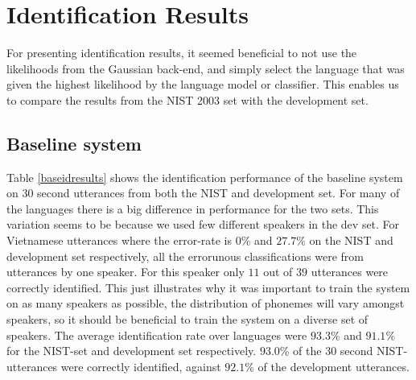 \chapter{Identification Results}

For presenting identification results, it seemed beneficial to not use the likelihoods from the Gaussian back-end, and simply select the language that was given the highest likelihood by the language model or classifier. This enables us to compare the results from the NIST 2003 set with the development set.

\section{Baseline system}

Table \ref{baseidresults} shows the identification performance of the baseline system on 30 second utterances from both the NIST and development set. For many of the languages there is a big difference in performance for the two sets. This variation seems to be because we used few different speakers in the dev set. For Vietnamese utterances where the error-rate is $0$\% and $27.7$\% on the NIST and development set respectively, all the errorunous classifications were from utterances by one speaker. For this speaker only $11$ out of $39$ utterances were correctly identified. This just illustrates why it was important to train the system on as many speakers as possible, the distribution of phonemes will vary amongst speakers, so it should be beneficial to train the system on a diverse set of speakers. The average identification rate over languages were $93.3$\% and $91.1$\% for the NIST-set and development set respectively. $93.0$\% of the 30 second NIST-utterances were correctly identified, against $92.1$\% of the development utterances. 
